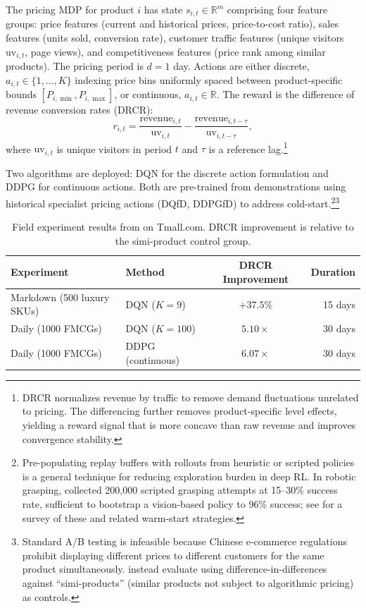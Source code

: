 The pricing MDP for product $i$ has state $s_{i,t} \in \mathbb{R}^m$ comprising four feature groups: price features (current and historical prices, price-to-cost ratio), sales features (units sold, conversion rate), customer traffic features (unique visitors $\text{uv}_{i,t}$, page views), and competitiveness features (price rank among similar products). The pricing period is $d = 1$ day. Actions are either discrete, $a_{i,t} \in \{1, \ldots, K\}$ indexing price bins uniformly spaced between product-specific bounds $[P_{i,\min}, P_{i,\max}]$, or continuous, $a_{i,t} \in \mathbb{R}$. The reward is the difference of revenue conversion rates (DRCR):
\begin{equation}
r_{i,t} = \frac{\text{revenue}_{i,t}}{\text{uv}_{i,t}} - \frac{\text{revenue}_{i,t-\tau}}{\text{uv}_{i,t-\tau}},
\end{equation}
where $\text{uv}_{i,t}$ is unique visitors in period $t$ and $\tau$ is a reference lag.\footnote{DRCR normalizes revenue by traffic to remove demand fluctuations unrelated to pricing. The differencing further removes product-specific level effects, yielding a reward signal that is more concave than raw revenue and improves convergence stability.}

Two algorithms are deployed: DQN for the discrete action formulation and DDPG for continuous actions. Both are pre-trained from demonstrations using historical specialist pricing actions (DQfD, DDPGfD) to address cold-start.\footnote{Pre-populating replay buffers with rollouts from heuristic or scripted policies is a general technique for reducing exploration burden in deep RL. In robotic grasping, \citet{Kalashnikov2018qtopt} collected 200,000 scripted grasping attempts at 15--30\% success rate, sufficient to bootstrap a vision-based policy to 96\% success; see \citet{Ibarz2021robot} for a survey of these and related warm-start strategies.}\footnote{Standard A/B testing is infeasible because Chinese e-commerce regulations prohibit displaying different prices to different customers for the same product simultaneously. \citet{Liu2019} instead evaluate using difference-in-differences against ``simi-products'' (similar products not subject to algorithmic pricing) as controls.}

\begin{table}[htbp]
\centering
\caption{Field experiment results from \citet{Liu2019} on Tmall.com. DRCR improvement is relative to the simi-product control group.}
\label{tab:ecommerce_pricing_results}
\begin{tabular}{llcr}
\toprule
Experiment & Method & DRCR Improvement & Duration \\
\midrule
Markdown (500 luxury SKUs) & DQN ($K=9$) & $+37.5\%$ & 15 days \\
Daily (1000 FMCGs) & DQN ($K=100$) & $5.10\times$ & 30 days \\
Daily (1000 FMCGs) & DDPG (continuous) & $6.07\times$ & 30 days \\
\bottomrule
\end{tabular}
\end{table}

